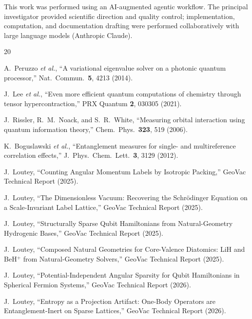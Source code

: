 \documentclass[twocolumn,pra,amsmath,amssymb,superscriptaddress]{revtex4-2}
\begin{document}

\begin{acknowledgments}
This work was performed using an AI-augmented agentic workflow.
The principal investigator provided scientific direction and quality
control; implementation, computation, and documentation drafting
were performed collaboratively with large language models (Anthropic
Claude).
\end{acknowledgments}


\begin{thebibliography}{20}

A.~Peruzzo \textit{et al.},
``A variational eigenvalue solver on a photonic quantum processor,''
Nat.\ Commun.\ \textbf{5}, 4213 (2014).

J.~Lee \textit{et al.},
``Even more efficient quantum computations of chemistry through
tensor hypercontraction,''
PRX Quantum \textbf{2}, 030305 (2021).

J.~Rissler, R.~M.~Noack, and S.~R.~White,
``Measuring orbital interaction using quantum information theory,''
Chem.\ Phys.\ \textbf{323}, 519 (2006).

K.~Boguslawski \textit{et al.},
``Entanglement measures for single- and multireference correlation
effects,''
J.\ Phys.\ Chem.\ Lett.\ \textbf{3}, 3129 (2012).

J.~Loutey,
``Counting Angular Momentum Labels by Isotropic Packing,''
GeoVac Technical Report (2025).

J.~Loutey,
``The Dimensionless Vacuum: Recovering the Schr\"odinger Equation on a Scale-Invariant Label Lattice,''
GeoVac Technical Report (2025).

J.~Loutey,
``Structurally Sparse Qubit Hamiltonians from Natural-Geometry Hydrogenic Bases,''
GeoVac Technical Report (2025).

J.~Loutey,
``Composed Natural Geometries for Core-Valence Diatomics: LiH and BeH$^+$ from Natural-Geometry Solvers,''
GeoVac Technical Report (2025).

J.~Loutey,
``Potential-Independent Angular Sparsity for Qubit Hamiltonians
in Spherical Fermion Systems,''
GeoVac Technical Report (2026).

J.~Loutey,
``Entropy as a Projection Artifact: One-Body Operators are
Entanglement-Inert on Sparse Lattices,''
GeoVac Technical Report (2026).

\end{thebibliography}
\end{document}
